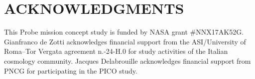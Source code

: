 \documentclass[]{spie}  %
\begin{document}




\section{ACKNOWLEDGMENTS}

This Probe mission concept study is funded by NASA grant \#NNX17AK52G.  Gianfranco de Zotti acknowledges financial support from the ASI/University of
Roma--Tor Vergata agreement n.-24-H.0 for study activities of the Italian cosmology community. Jacques
Delabrouille acknowledges financial support from PNCG for participating in the PICO study.


\end{document}
